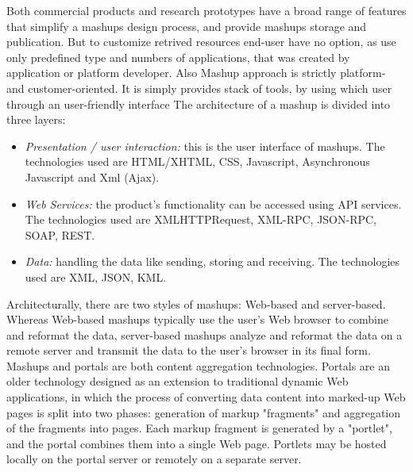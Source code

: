 Both commercial products and research prototypes have a broad range of features that simplify a mashups design process, and provide mashups storage and publication. But to customize retrived resources end-user have no option, as use only predefined type and numbers of applications, that was created by application or platform developer. Also Mashup approach is strictly platform- and customer-oriented. It is simply provides stack of tools, by using which user through an user-friendly interface 
The architecture of a mashup is divided into three layers:
 \newline
 \begin{itemize}
\item \emph {Presentation / user interaction:} this is the user interface of mashups. The technologies used are HTML/XHTML, CSS, Javascript, Asynchronous Javascript and Xml (Ajax).
 \newline
\item \emph {Web Services:} the product's functionality can be accessed using API services. The technologies used are XMLHTTPRequest, XML-RPC, JSON-RPC, SOAP, REST.
 \newline
\item \emph {Data:} handling the data like sending, storing and receiving. The technologies used are XML, JSON, KML.
 \newline
 \end{itemize}
Architecturally, there are two styles of mashups: Web-based and server-based. Whereas Web-based mashups typically use the user's Web browser to combine and reformat the data, server-based mashups analyze and reformat the data on a remote server and transmit the data to the user's browser in its final form\cite{bolin2005end}.
 \newline
Mashups and portals are both content aggregation technologies. Portals are an older technology designed as an extension to traditional dynamic Web applications, in which the process of converting data content into marked-up Web pages is split into two phases: generation of markup "fragments" and aggregation of the fragments into pages. Each markup fragment is generated by a "portlet", and the portal combines them into a single Web page. Portlets may be hosted locally on the portal server or remotely on a separate server.
\newline
